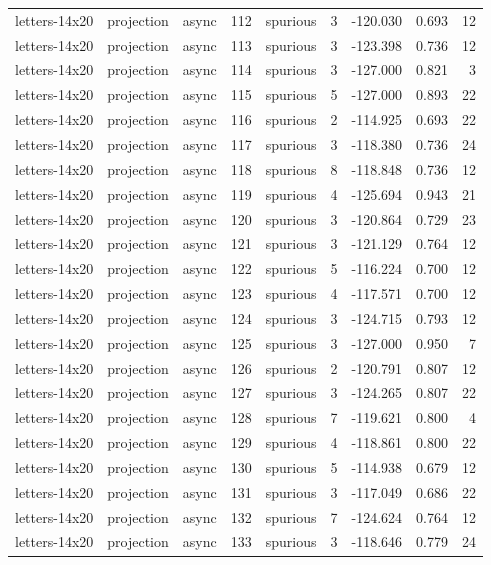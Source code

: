 \begin{tabular}{lllrlrrrr}
letters-14x20 & projection & async & 112 & spurious & 3 & -120.030 & 0.693 & 12 \\
letters-14x20 & projection & async & 113 & spurious & 3 & -123.398 & 0.736 & 12 \\
letters-14x20 & projection & async & 114 & spurious & 3 & -127.000 & 0.821 & 3 \\
letters-14x20 & projection & async & 115 & spurious & 5 & -127.000 & 0.893 & 22 \\
letters-14x20 & projection & async & 116 & spurious & 2 & -114.925 & 0.693 & 22 \\
letters-14x20 & projection & async & 117 & spurious & 3 & -118.380 & 0.736 & 24 \\
letters-14x20 & projection & async & 118 & spurious & 8 & -118.848 & 0.736 & 12 \\
letters-14x20 & projection & async & 119 & spurious & 4 & -125.694 & 0.943 & 21 \\
letters-14x20 & projection & async & 120 & spurious & 3 & -120.864 & 0.729 & 23 \\
letters-14x20 & projection & async & 121 & spurious & 3 & -121.129 & 0.764 & 12 \\
letters-14x20 & projection & async & 122 & spurious & 5 & -116.224 & 0.700 & 12 \\
letters-14x20 & projection & async & 123 & spurious & 4 & -117.571 & 0.700 & 12 \\
letters-14x20 & projection & async & 124 & spurious & 3 & -124.715 & 0.793 & 12 \\
letters-14x20 & projection & async & 125 & spurious & 3 & -127.000 & 0.950 & 7 \\
letters-14x20 & projection & async & 126 & spurious & 2 & -120.791 & 0.807 & 12 \\
letters-14x20 & projection & async & 127 & spurious & 3 & -124.265 & 0.807 & 22 \\
letters-14x20 & projection & async & 128 & spurious & 7 & -119.621 & 0.800 & 4 \\
letters-14x20 & projection & async & 129 & spurious & 4 & -118.861 & 0.800 & 22 \\
letters-14x20 & projection & async & 130 & spurious & 5 & -114.938 & 0.679 & 12 \\
letters-14x20 & projection & async & 131 & spurious & 3 & -117.049 & 0.686 & 22 \\
letters-14x20 & projection & async & 132 & spurious & 7 & -124.624 & 0.764 & 12 \\
letters-14x20 & projection & async & 133 & spurious & 3 & -118.646 & 0.779 & 24 \\

\end{tabular}
